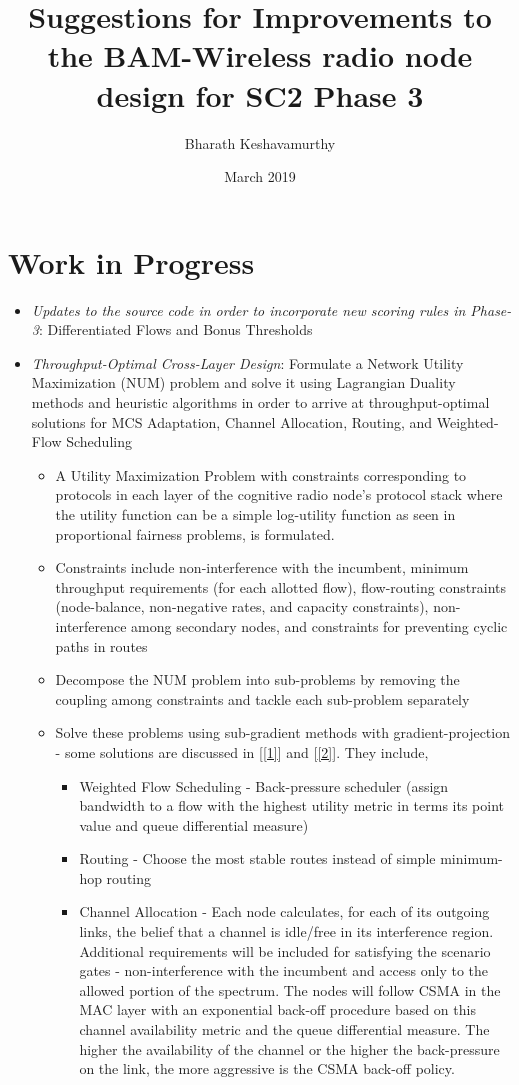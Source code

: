 \documentclass{article}
\title{Suggestions for Improvements to the BAM-Wireless radio node design for SC2 Phase 3}
\author{Bharath Keshavamurthy}
\date{March 2019}
\begin{document}
\maketitle
\section{Work in Progress}
\begin{itemize}
    \item \textit{Updates to the source code in order to incorporate new scoring rules in Phase-3}: Differentiated Flows and Bonus Thresholds
    \item \textit{Throughput-Optimal Cross-Layer Design}: Formulate a Network Utility Maximization (NUM) problem and solve it using Lagrangian Duality methods and heuristic algorithms in order to arrive at throughput-optimal solutions for MCS Adaptation, Channel Allocation, Routing, and Weighted-Flow Scheduling
    \begin{itemize}
        \item A Utility Maximization Problem with constraints corresponding to protocols in each layer of the cognitive radio node's protocol stack where the utility function can be a simple log-utility function as seen in proportional fairness problems, is formulated.
        \item Constraints include non-interference with the incumbent, minimum throughput requirements (for each allotted flow), flow-routing constraints (node-balance, non-negative rates, and capacity constraints), non-interference among secondary nodes, and constraints for preventing cyclic paths in routes
        \item Decompose the NUM problem into sub-problems by removing the coupling among constraints and tackle each sub-problem separately
        \item Solve these problems using sub-gradient methods with gradient-projection - some solutions are discussed in [\ref{1}] and [\ref{2}]. They include,
        \begin{itemize}
            \item Weighted Flow Scheduling - Back-pressure scheduler (assign bandwidth to a flow with the highest utility metric in terms its point value and queue differential measure)
            \item Routing - Choose the most stable routes instead of simple minimum-hop routing
            \item Channel Allocation - Each node calculates, for each of its outgoing links, the belief that a channel is idle/free in its interference region. Additional requirements will be included for satisfying the scenario gates - non-interference with the incumbent and access only to the allowed portion of the spectrum. The nodes will follow CSMA in the MAC layer with an exponential back-off procedure based on this channel availability metric and the queue differential measure. The higher the availability of the channel or the higher the back-pressure on the link, the more aggressive is the CSMA back-off policy.

\end{itemize}
\end{itemize}
\end{itemize}
\end{document}
